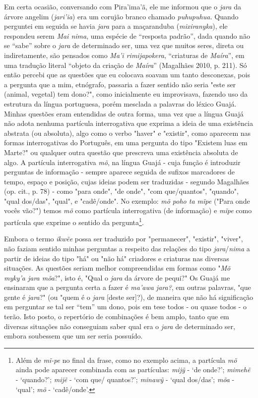Em certa ocasião, conversando com Pira'ima'ã, ele me informou que o
\emph{jara} da árvore angelim (\emph{jari'ia}) era um corujão branco
chamado \emph{puhupuhua.} Quando perguntei em seguida se havia
\emph{jara} para a maçaranduba (\emph{mixiranyka}), ele respondeu serem
\emph{Mai nima}, uma espécie de ``resposta padrão'', dada quando não se
``sabe'' sobre o \emph{jara} de determinado ser, uma vez que muitos
seres, direta ou indiretamente, são pensados como \emph{Ma'i
rimijapokera}, ``criaturas de \emph{Maíra}'', em uma tradução literal
``objeto da criação de \emph{Maíra}'' (Magalhães 2010, p. 211). Só então
percebi que as questões que eu colocava soavam um tanto desconexas, pois
a pergunta que a mim, etnógrafo, passaria a fazer sentido não seria
"este ser (animal, vegetal) tem dono?", como inicialmente eu
improvisava, fazendo uso da estrutura da língua portuguesa, porém
mesclada a palavras do léxico Guajá. Minhas questões eram entendidas de
outra forma, uma vez que a língua Guajá não adota nenhuma partícula
interrogativa que exprima a ideia de uma existência abstrata (ou
absoluta), algo como o verbo "haver" e "existir", como aparecem nas
formas interrogativas do Português, em uma pergunta do tipo "Existem
luas em Marte?" ou qualquer outra questão que prescreva uma existência
absoluta de algo. A partícula interrogativa \emph{mõ}, na língua Guajá -
cuja função é introduzir perguntas de informação - sempre aparece
seguida de sufixos marcadores de tempo, espaço e posição, cujas ideias
podem ser traduzidas - segundo Magalhães (op. cit., p. 78) - como "para
onde", "de onde", "com que/quantos", "quando", "qual dos/das", "qual", e
"cadê/onde". No exemplo: \emph{mõ poho ta mĩpe} ("Para onde vocês vão?")
temos \emph{mõ} como partícula interrogativa (de informação) e
\emph{mĩpe} como partícula que exprime o sentido da pergunta\footnote{Além
  de \emph{mĩ-pe} no final da frase, como no exemplo acima, a partícula
  \emph{mõ} ainda pode aparecer combinada com as partículas: \emph{mijỹ}
  - `de onde?'; \emph{mimehẽ} - `quando?'; \emph{mijẽ} - `com que/
  quantos?'; \emph{minawỹ} - `qual dos/das'; \emph{mõa} - `qual';
  \emph{mõ} - `cadê/onde'.}.

Embora o termo \emph{ikwẽe} possa ser traduzido por "permanecer",
"existir", "viver", não faziam sentido minhas perguntas a respeito das
relações do tipo \emph{jara}/\emph{nima} a partir de ideias do tipo "há"
ou "não há" criadores e criaturas nas diversas situações. As questões
seriam melhor compreendidas em formas como "\emph{Mõ myky'a jara mõa}?",
isto é, "Qual o \emph{jara} da árvore de pequi?" Os Guajá me ensinaram
que a pergunta certa a fazer é \emph{ma'awa jara?}, em outras palavras,
"que gente é \emph{jara}?" (ou "quem é o \emph{jara} {[}deste ser{]}?),
de maneira que não há significação em perguntar se tal ser ``tem'' um
dono, pois em tese todos - ou quase todos - o terão. Isto posto, o
repertório de combinações é bem amplo, tanto que em diversas situações
não conseguiam saber qual era o \emph{jara} de determinado ser, embora
soubessem que um ser seria possuído.


